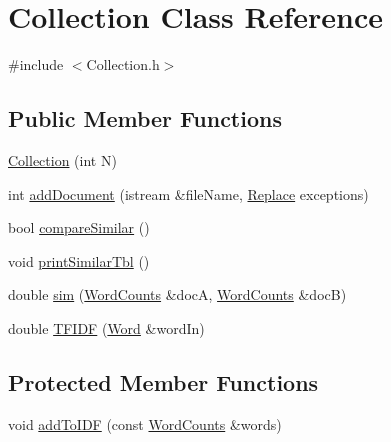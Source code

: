 \hypertarget{class_collection}{}\section{Collection Class Reference}
\label{class_collection}


{\ttfamily \#include $<$Collection.\+h$>$}

\subsection*{Public Member Functions}
\begin{DoxyCompactItemize}
\item 
\hyperlink{class_collection_a1f1f84178b666f0cb08d58c362473566}{Collection} (int N)
\item 
int \hyperlink{class_collection_a9e83d26623d9125ec37f84be550e2bcd}{add\+Document} (istream \&file\+Name, \hyperlink{class_replace}{Replace} exceptions)
\item 
bool \hyperlink{class_collection_a31d244d8b65c7e869ee2855485e830b5}{compare\+Similar} ()
\item 
void \hyperlink{class_collection_a2078811e68c0508d0f313e4cc72ab90c}{print\+Similar\+Tbl} ()
\item 
double \hyperlink{class_collection_a3fde023d06ce5f5b14a3f3ab084bd7dd}{sim} (\hyperlink{class_word_counts}{Word\+Counts} \&docA, \hyperlink{class_word_counts}{Word\+Counts} \&docB)
\item 
double \hyperlink{class_collection_a97bcf6c668c2bb836baf245fcc3abdc2}{T\+F\+I\+DF} (\hyperlink{class_word}{Word} \&word\+In)
\end{DoxyCompactItemize}
\subsection*{Protected Member Functions}
\begin{DoxyCompactItemize}
\item 
void \hyperlink{class_collection_abbd27617121505cf86345cdf9f74d58b}{add\+To\+I\+DF} (const \hyperlink{class_word_counts}{Word\+Counts} \&words)
\end{DoxyCompactItemize}
